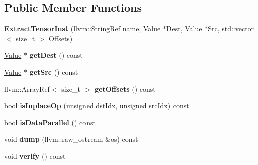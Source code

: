 \subsection*{Public Member Functions}
\begin{DoxyCompactItemize}
\item 
\mbox{\label{classglow_1_1_extract_tensor_inst_adf36d02fc6cceaf4a9f8fb478fa2a731}} 
{\bfseries Extract\+Tensor\+Inst} (llvm\+::\+String\+Ref name, \hyperlink{classglow_1_1_value}{Value} $\ast$Dest, \hyperlink{classglow_1_1_value}{Value} $\ast$Src, std\+::vector$<$ size\+\_\+t $>$ Offsets)
\item 
\mbox{\label{classglow_1_1_extract_tensor_inst_a914d0bcd40e56d8b3f9f5131c871c863}} 
\hyperlink{classglow_1_1_value}{Value} $\ast$ {\bfseries get\+Dest} () const
\item 
\mbox{\label{classglow_1_1_extract_tensor_inst_aa686f2e76651dc0006cd814805777057}} 
\hyperlink{classglow_1_1_value}{Value} $\ast$ {\bfseries get\+Src} () const
\item 
\mbox{\label{classglow_1_1_extract_tensor_inst_a8b96717e9f2d4b1b1a0988dd19f2f921}} 
llvm\+::\+Array\+Ref$<$ size\+\_\+t $>$ {\bfseries get\+Offsets} () const
\item 
\mbox{\label{classglow_1_1_extract_tensor_inst_a405c2cd11f433a04c80f9786e101f4f5}} 
bool {\bfseries is\+Inplace\+Op} (unsigned dst\+Idx, unsigned src\+Idx) const
\item 
\mbox{\label{classglow_1_1_extract_tensor_inst_a4d1b0e6af6d982fd1f05abe7129ca2fe}} 
bool {\bfseries is\+Data\+Parallel} () const
\item 
\mbox{\label{classglow_1_1_extract_tensor_inst_ae94fb0d067137941bc81eccf8adffa72}} 
void {\bfseries dump} (llvm\+::raw\+\_\+ostream \&os) const
\item 
\mbox{\label{classglow_1_1_extract_tensor_inst_a6549244c8033e2ed631d482f4abab06d}} 
void {\bfseries verify} () const
\end{DoxyCompactItemize}
